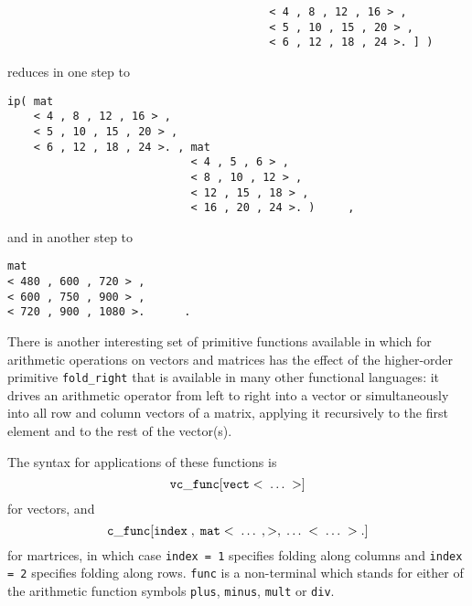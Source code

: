 \begin{itemize}
\begin{verbatim}
                                        < 4 , 8 , 12 , 16 > ,
                                        < 5 , 10 , 15 , 20 > ,
                                        < 6 , 12 , 18 , 24 >. ] )
\end{verbatim}
reduces in one step to
\begin{verbatim}
ip( mat 
    < 4 , 8 , 12 , 16 > ,
    < 5 , 10 , 15 , 20 > ,
    < 6 , 12 , 18 , 24 >. , mat 
                            < 4 , 5 , 6 > ,
                            < 8 , 10 , 12 > ,
                            < 12 , 15 , 18 > ,
                            < 16 , 20 , 24 >. )     ,
\end{verbatim}
and in another step to
\begin{verbatim}
mat 
< 480 , 600 , 720 > ,
< 600 , 750 , 900 > ,
< 720 , 900 , 1080 >.      .
\end{verbatim}
\end{itemize}
There is another interesting set of primitive functions
 available in \kir which for arithmetic operations on
vectors and matrices has the effect of the higher-order
primitive {\tt fold\_right} that is available in many other
functional languages: it drives an arithmetic operator
from left to right into a vector or simultaneously
into all row and column vectors of a matrix, applying
it recursively to the first element and to the rest of
the vector(s).

 The syntax for applications of these functions is
$$
{\tt vc\_func[vect<\;\ldots\;>]}
$$
for vectors, and
$$
{\tt c\_func[index\;,\;mat<\;\ldots\;,>,\;\ldots\;<\;\ldots\;>.]}
$$
for martrices, in which case {\tt index = 1} specifies
folding along columns and {\tt index = 2} specifies folding along
rows.
{\tt func} is a non-terminal which 
stands for either of the arithmetic function 
symbols {\tt plus}, {\tt minus}, {\tt mult} or {\tt div}. 

